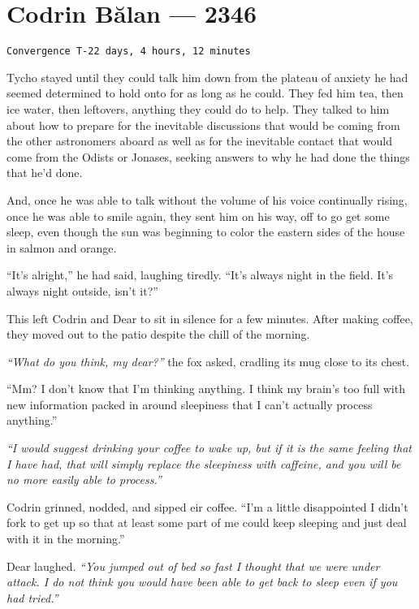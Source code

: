\hypertarget{codrin-bux103lan-2346}{%
\chapter{Codrin Bălan — 2346}\label{codrin-bux103lan-2346}}

\begin{verbatim}
Convergence T-22 days, 4 hours, 12 minutes
\end{verbatim}

Tycho stayed until they could talk him down from the plateau of anxiety he had seemed determined to hold onto for as long as he could. They fed him tea, then ice water, then leftovers, anything they could do to help. They talked to him about how to prepare for the inevitable discussions that would be coming from the other astronomers aboard as well as for the inevitable contact that would come from the Odists or Jonases, seeking answers to why he had done the things that he'd done.

And, once he was able to talk without the volume of his voice continually rising, once he was able to smile again, they sent him on his way, off to go get some sleep, even though the sun was beginning to color the eastern sides of the house in salmon and orange.

``It's alright,'' he had said, laughing tiredly. ``It's always night in the field. It's always night outside, isn't it?''

This left Codrin and Dear to sit in silence for a few minutes. After making coffee, they moved out to the patio despite the chill of the morning.

\emph{``What do you think, my dear?''} the fox asked, cradling its mug close to its chest.

``Mm? I don't know that I'm thinking anything. I think my brain's too full with new information packed in around sleepiness that I can't actually process anything.''

\emph{``I would suggest drinking your coffee to wake up, but if it is the same feeling that I have had, that will simply replace the sleepiness with caffeine, and you will be no more easily able to process.''}

Codrin grinned, nodded, and sipped eir coffee. ``I'm a little disappointed I didn't fork to get up so that at least some part of me could keep sleeping and just deal with it in the morning.''

Dear laughed. \emph{``You jumped out of bed so fast I thought that we were under attack. I do not think you would have been able to get back to sleep even if you had tried.''}

